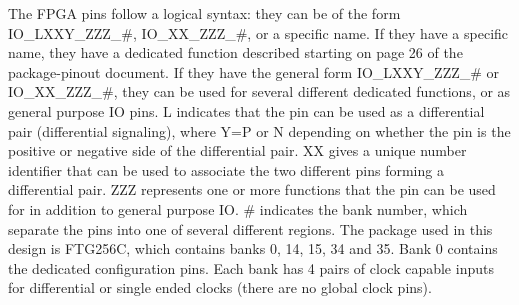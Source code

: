 The FPGA pins follow a logical syntax: they can be of the form IO\_LXXY\_ZZZ\_\#, IO\_XX\_ZZZ\_\#,
or a specific name. If they have a specific name, they have a dedicated function described starting
on page 26 of the package-pinout document. If they have the general form IO\_LXXY\_ZZZ\_\# or
IO\_XX\_ZZZ\_\#, they can be used for several different dedicated functions, or as general purpose
IO pins. L indicates that the pin can be used as a differential pair (differential signaling), where
Y=P or N depending on whether the pin is the positive or negative side of the differential pair. XX
gives a unique number identifier that can be used to associate the two different pins forming a
differential pair. ZZZ represents one or more functions that the pin can be used for in addition to
general purpose IO. \# indicates the bank number, which separate the pins into one of several
different regions. The package used in this design is FTG256C, which contains banks 0, 14, 15, 34
and 35. Bank 0 contains the dedicated configuration pins. Each bank has 4 pairs of clock capable
inputs for differential or single ended clocks (there are no global clock pins).


